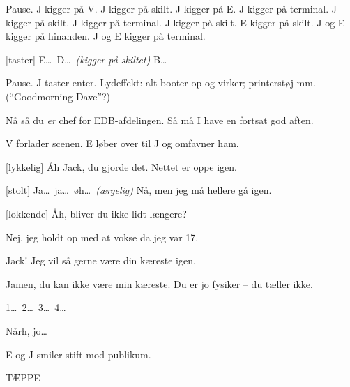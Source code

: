 \documentclass[danish]{article}
\begin{document}
\begin{sketch}
\scene Pause. J kigger på V. J kigger på skilt. J kigger på E. J kigger på
terminal. J kigger på skilt. J kigger på terminal. J kigger på skilt. E kigger
på skilt. J og E kigger på hinanden. J og E kigger på terminal.

[taster] E\ldots\ D\ldots\ \emph{(kigger på skiltet)} B\ldots

\scene Pause. J taster enter. Lydeffekt: alt booter op og virker; printerstøj
mm. (``Goodmorning Dave''?)

 Nå så du \emph{er} chef for EDB-afdelingen. Så må I have en fortsat god
aften.

\scene V forlader scenen. E løber over til J og omfavner ham.

[lykkelig] Åh Jack, du gjorde det. Nettet er oppe igen.

[stolt] Ja\ldots\ ja\ldots\ øh\ldots\ \emph{(ærgelig)} Nå, men jeg må
hellere gå igen.

[lokkende] Åh, bliver du ikke lidt længere?

 Nej, jeg holdt op med at vokse da jeg var 17.

 Jack! Jeg vil så gerne være din kæreste igen.

 Jamen, du kan ikke være min kæreste. Du er jo fysiker -- du tæller
ikke.

 1\ldots\ 2\ldots\ 3\ldots\ 4\ldots

 Nårh, jo\ldots

\scene E og J smiler stift mod publikum.

\scene TÆPPE

\end{sketch}
\end{document}
